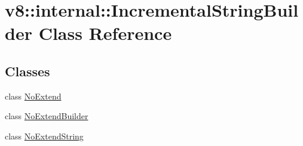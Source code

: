 \hypertarget{classv8_1_1internal_1_1_incremental_string_builder}{}\section{v8\+:\+:internal\+:\+:Incremental\+String\+Builder Class Reference}
\label{classv8_1_1internal_1_1_incremental_string_builder}
\subsection*{Classes}
\begin{DoxyCompactItemize}
\item 
class \hyperlink{classv8_1_1internal_1_1_incremental_string_builder_1_1_no_extend}{No\+Extend}
\item 
class \hyperlink{classv8_1_1internal_1_1_incremental_string_builder_1_1_no_extend_builder}{No\+Extend\+Builder}
\item 
class \hyperlink{classv8_1_1internal_1_1_incremental_string_builder_1_1_no_extend_string}{No\+Extend\+String}
\end{DoxyCompactItemize}
